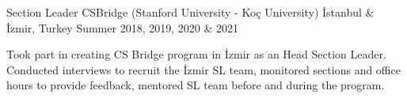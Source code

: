 
\vspace*{-1.5mm}

\begin{cventries}



  \cventry
    {Section Leader}%
    {CSBridge (Stanford University - Koç University)} %
    {İstanbul \& İzmir, Turkey}
    {Summer 2018, 2019, 2020 \& 2021} 
    {
      \begin{cvitems}
        \item{Took part in creating CS Bridge program in İzmir as an Head Section Leader. Conducted interviews to recruit the İzmir SL team, monitored sections and office hours to provide feedback, mentored SL team before and during the program.}
      \end{cvitems}
    }



\end{cventries}
